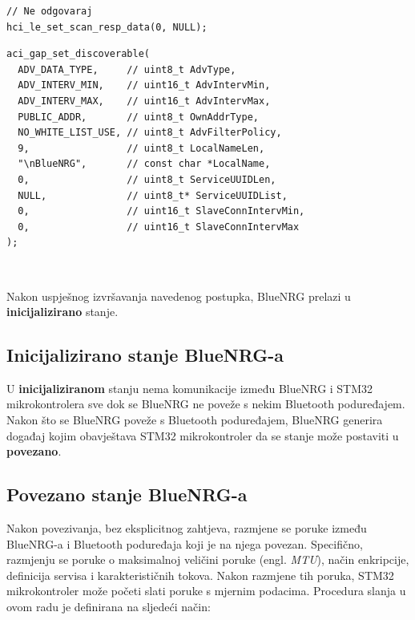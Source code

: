 \documentclass[times, utf8, diplomski]{diplomski}
\begin{document}
\begin{lstlisting}[caption={Postavi odgovor na poruku otkrivanja (engl. \textit{discover message})}]
// Ne odgovaraj
hci_le_set_scan_resp_data(0, NULL);
\end{lstlisting}

\begin{lstlisting}[caption={Postavi stanje BlueNRG-a u stanje u povezivo stanje}, label={lastinit}]
aci_gap_set_discoverable(
  ADV_DATA_TYPE,     // uint8_t AdvType,
  ADV_INTERV_MIN,    // uint16_t AdvIntervMin,
  ADV_INTERV_MAX,    // uint16_t AdvIntervMax,
  PUBLIC_ADDR,       // uint8_t OwnAddrType,
  NO_WHITE_LIST_USE, // uint8_t AdvFilterPolicy,
  9,                 // uint8_t LocalNameLen,
  "\nBlueNRG",       // const char *LocalName,
  0,                 // uint8_t ServiceUUIDLen,
  NULL,              // uint8_t* ServiceUUIDList,
  0,                 // uint16_t SlaveConnIntervMin,
  0,                 // uint16_t SlaveConnIntervMax
);
\end{lstlisting}
\ \

Nakon uspješnog izvršavanja navedenog postupka, BlueNRG prelazi u \textbf{inicijalizirano} stanje.

\subsection{Inicijalizirano stanje BlueNRG-a}
U \textbf{inicijaliziranom} stanju nema komunikacije između BlueNRG i STM32 mikrokontrolera sve dok se BlueNRG ne poveže s nekim Bluetooth poduređajem. Nakon što se BlueNRG poveže s Bluetooth poduređajem, BlueNRG generira događaj kojim obavještava STM32 mikrokontroler da se stanje može postaviti u \textbf{povezano}.

\subsection{Povezano stanje BlueNRG-a}
Nakon povezivanja, bez eksplicitnog zahtjeva, razmjene se poruke između BlueNRG-a i Bluetooth poduređaja koji je na njega povezan. Specifično, razmjenju se poruke o maksimalnoj veličini poruke (engl. \textit{MTU}), način enkripcije, definicija servisa i karakterističnih tokova. Nakon razmjene tih poruka, STM32 mikrokontroler može početi slati poruke s mjernim podacima. Procedura slanja u ovom radu je definirana na sljedeći način:
\end{document}
